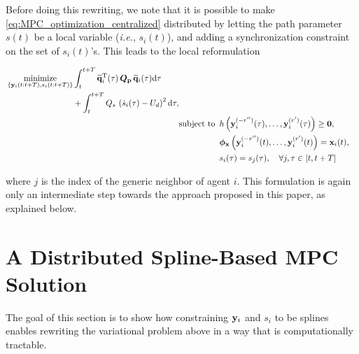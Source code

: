 Before doing this rewriting, we note that it is possible to make \eqref{eq:MPC_optimization_centralized} distributed by letting the path parameter $s(t)$ be a local variable (\emph{i.e.}, $s_i(t)$), and adding a synchronization constraint on the set of $s_i(t)$'s. This leads to the local reformulation

\begin{subequations}
    \begin{align}
        \begin{split}
            &\opt_{ \left\lbrace \mat{y}_i(t:t+T), s_i(t:t+T) \right\rbrace }
            \int_{t}^{t+T}
                \widetilde{\mat{q}}_i\T(\tau)
                \, \bm{Q}_{\mat{p}} \, 
                \widetilde{\mat{q}}_i(\tau)
                {\rm d}\tau \\
            & \qquad \qquad \qquad \qquad
            + \int_{t}^{t+T} Q_s \,\left(\dot{s}_i(\tau) - U_d\right)^2 {\rm d}\tau , 
        \end{split} \label{eq:MPC_criterion}\\
        & \text{subject to } \, h\left(\mat{y}_i^{(-r'')}(\tau), \ldots, \mat{y}^{(r')}_i(\tau)\right) \geq \bm{0}, \label{eq:MPC_constraint_h} \\
        & \phantom{\text{subject to } \,} \bm{\phi}_{\mat{x}} \left(\mat{y}_i^{(-r'')}(t), \ldots, \mat{y}^{(r')}_i(t)\right) = \mat{x}_{i}(t), \label{eq:MPC_constraint_x0} \\
        & \phantom{\text{subject to } \,} s_i(\tau) = s_j(\tau), \quad \forall j, \tau \in [t, t+T] \label{eq:MPC_constraint_gamma_s}
    \end{align}
\label{eq:MPC_optimization_distributed}

\end{subequations}

\noindent where $j$ is the index of the generic neighbor of agent $i$. This formulation is again only an intermediate step towards the approach proposed in this paper, as explained below. 



\section{A Distributed Spline-Based MPC Solution}
\label{sec:MPC_spline-based-MPC}



The goal of this section is to show how constraining $\mathbf{y}_i$ and $s_i$ to be splines enables rewriting the variational problem above in a way that is computationally tractable.

